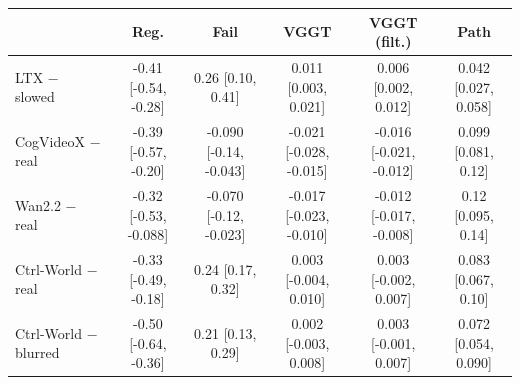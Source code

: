\begin{tabular}{lccccc}
\toprule
 & Reg. & Fail & VGGT & VGGT (filt.) & Path \\
\midrule
LTX $-$ slowed & -0.41 [-0.54, -0.28] & 0.26 [0.10, 0.41] & 0.011 [0.003, 0.021] & 0.006 [0.002, 0.012] & 0.042 [0.027, 0.058] \\
CogVideoX $-$ real & -0.39 [-0.57, -0.20] & -0.090 [-0.14, -0.043] & -0.021 [-0.028, -0.015] & -0.016 [-0.021, -0.012] & 0.099 [0.081, 0.12] \\
Wan2.2 $-$ real & -0.32 [-0.53, -0.088] & -0.070 [-0.12, -0.023] & -0.017 [-0.023, -0.010] & -0.012 [-0.017, -0.008] & 0.12 [0.095, 0.14] \\
Ctrl-World $-$ real & -0.33 [-0.49, -0.18] & 0.24 [0.17, 0.32] & 0.003 [-0.004, 0.010] & 0.003 [-0.002, 0.007] & 0.083 [0.067, 0.10] \\
Ctrl-World $-$ blurred & -0.50 [-0.64, -0.36] & 0.21 [0.13, 0.29] & 0.002 [-0.003, 0.008] & 0.003 [-0.001, 0.007] & 0.072 [0.054, 0.090] \\
\bottomrule
\end{tabular}